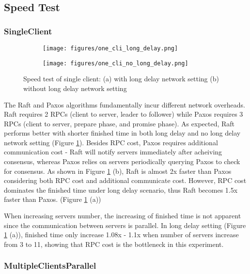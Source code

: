 \documentclass[11pt,a4paper]{article}
\begin{document}
\subsection{Speed Test}
\subsubsection{SingleClient}

\begin{figure}[!ht]
    \begin{subfigure}{0.48\textwidth}
        \texttt{[image: figures/one\_cli\_long\_delay.png]}
        \caption{}
    \end{subfigure}
    \hfill
    \begin{subfigure}{0.48\textwidth}
        \texttt{[image: figures/one\_cli\_no\_long\_delay.png]}
        \caption{}
    \end{subfigure}
    \caption{Speed test of single client: (a) with long delay network setting (b) without long delay network setting}
    \label{fig:speed_singleClient}
\end{figure}

The Raft and Paxos algorithms fundamentally incur different network overheads. Raft requires 2 RPCs (client to server, leader to follower) while Paxos requires 3 RPCs (client to server, prepare phase, and promise phase). As expected, Raft performs better with shorter finished time in both long delay and no long delay network setting (Figure \ref{fig:speed_singleClient}). Besides RPC cost, Paxos requires additional communication cost - Raft will notify servers immediately after acheiving consensus, whereas Paxos relies on servers periodically querying Paxos to check for consensus. As shown in Figure \ref{fig:speed_singleClient} (b), Raft is almost 2x faster than Paxos considering both RPC cost and additional communicate cost. However, RPC cost dominates the finished time under long delay scenario, thus Raft becomes 1.5x faster than Paxos. (Figure \ref{fig:speed_singleClient} (a))

When increasing servers number, the increasing of finished time is not apparent since the communication between servers is parallel. In long delay setting (Figure \ref{fig:speed_singleClient} (a)), finished time only increase 1.08x - 1.1x when number of servers increase from 3 to 11, showing that RPC cost is the bottleneck in this experiment.

\subsubsection{MultipleClientsParallel}
\end{document}
